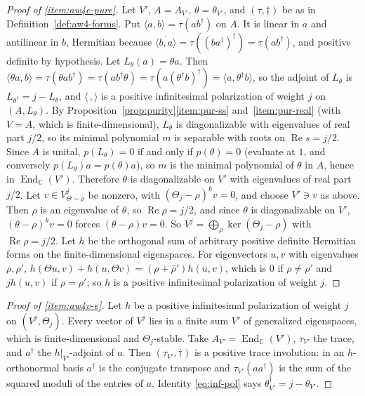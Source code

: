 \documentclass[11pt]{amsart}
\theoremstyle{plain}
\theoremstyle{definition}
\theoremstyle{remark}
\numberwithin{equation}{section}
\newcommand{\C}{\mathbb{C}}
\DeclareMathOperator{\Rea}{Re}
\renewcommand{\Re}{\Rea}
\begin{document}
\begin{proof}[Proof of \ref{item:aw4e-pure}]
Let $V'$, $A=A_{V'}$, $\theta=\theta_{V'}$, and $(\tau,\dagger)$ be as in
Definition~\ref{def:aw4-forms}. Put $\langle a,b\rangle=\tau(ab^\dagger)$
on $A$. It is linear in $a$ and antilinear in $b$, Hermitian because
$\overline{\langle b,a\rangle}=\tau((ba^\dagger)^\dagger)=
\tau(ab^\dagger)$, and positive definite by hypothesis. Let
$L_\theta(a)=\theta a$. Then
$\langle\theta a,b\rangle=\tau(\theta ab^\dagger)=\tau(ab^\dagger\theta)
=\tau(a(\theta^\dagger b)^\dagger)=\langle a,\theta^\dagger b\rangle$,
so the adjoint of $L_\theta$ is $L_{\theta^\dagger}=j-L_\theta$,
and $\langle\,,\rangle$ is a positive infinitesimal polarization of
weight $j$ on $(A,L_\theta)$. By
Proposition~\ref{prop:purity}\ref{item:pur-ss} and~\ref{item:pur-real}
(with $V=A$, which is finite-dimensional), $L_\theta$ is diagonalizable
with eigenvalues of real part $j/2$, so its minimal polynomial $m$
is separable with roots on $\Re s=j/2$. Since $A$ is unital,
$p(L_\theta)=0$ if and only if $p(\theta)=0$ (evaluate at $1$, and
conversely $p(L_\theta)a=p(\theta)a$), so $m$ is the minimal polynomial
of $\theta$ in $A$, hence in $\operatorname{End}_\C(V')$. Therefore
$\theta$ is diagonalizable on $V'$ with eigenvalues of real part
$j/2$. Let $v\in V^j_{\Theta\sim\rho}$ be nonzero, with
$(\Theta_j-\rho)^kv=0$, and choose $V'\ni v$ as above. Then $\rho$ is an
eigenvalue of $\theta$, so $\Re\rho=j/2$, and since $\theta$ is
diagonalizable on $V'$, $(\theta-\rho)^kv=0$ forces $(\theta-\rho)v=0$.
So $V^j=\bigoplus_\rho\ker(\Theta_j-\rho)$ with
$\Re\rho=j/2$. Let $h$ be the orthogonal sum of arbitrary positive
definite Hermitian forms on the finite-dimensional eigenspaces. For
eigenvectors $u,v$ with eigenvalues $\rho,\rho'$,
$h(\Theta u,v)+h(u,\Theta v)=(\rho+\bar\rho')h(u,v)$, which is $0$ if
$\rho\ne\rho'$ and $jh(u,v)$ if $\rho=\rho'$; so $h$ is a positive
infinitesimal polarization of weight $j$.
\end{proof}

\begin{proof}[Proof of \ref{item:aw4v-e}]
Let $h$ be a positive infinitesimal polarization of weight $j$ on
$(V^j,\Theta_j)$. Every vector of $V^j$ lies in a finite sum $V'$ of
generalized eigenspaces, which is finite-dimensional and
$\Theta_j$-stable. Take $A_{V'}=\operatorname{End}_\C(V')$, $\tau_{V'}$ the
trace, and $a^\dagger$ the $h|_{V'}$-adjoint of $a$. Then $(\tau_{V'},\dagger)$
is a positive trace involution: in an $h$-orthonormal basis
$a^\dagger$ is the conjugate transpose and $\tau_{V'}(aa^\dagger)$ is the
sum of the squared moduli of the entries of $a$. Identity
\eqref{eq:inf-pol} says $\theta_{V'}^\dagger=j-\theta_{V'}$.
\end{proof}
\end{document}
